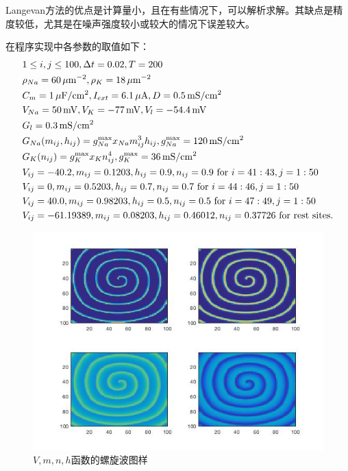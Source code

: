 \documentclass[
bachelor,
nofont, %
pdflinks,
]{xjtuthesis}
\begin{document}
Langevan方法的优点是计算量小，且在有些情况下，可以解析求解。其缺点是精度较低，尤其是在噪声强度较小或较大的情况下误差较大。

\newcommand{\cm}{\mathrm{cm}}
\newcommand{\ms}{\,\mathrm{mS}}
\newcommand{\mv}{\,\mathrm{mV}}
\newcommand{\um}{\,\mathrm{\mu m}}
\newcommand{\uf}{\,\mathrm{\mu F}}
\newcommand{\ua}{\,\mathrm{\mu A}}

在程序实现中各参数的取值如下：
\begin{align*}
& 1 \le i,j \le 100, \Delta t = 0.02, T = 200 \\
& \rho_{Na} = 60 \um^{-2}, \rho_{K} = 18 \um^{-2}\\
& C_m = 1 \uf / \cm ^2, I _{ext} = 6.1 \ua, D = 0.5 \ms / \cm ^2\\
& \vna = 50 \mv, \vk = -77 \mv, \vl = -54.4 \mv\\
& \gl = 0.3 \ms / \cm^2\\
& \gna (m_{ij}, h_{ij}) = g _{Na} ^{\max} x _{Na} m ^3 _{ij} h _{ij}, g ^{\max} _{Na} = 120 \ms / \cm ^2\\
& \gk (n_{ij}) = g_{K} ^{\max} x_{K} n^4 _{ij}, g_{K} ^{\max} = 36 \ms / \cm ^2 \\
& V_{ij}=-40.2, m_{ij}=0.1203, h_{ij}=0.9, n_{ij}=0.9 \text{ for } i=41:43, j = 1 : 50 \\
& V_{ij}=0, m_{ij}=0.5203, h_{ij}=0.7, n_{ij}=0.7 \text{ for } i = 44 : 46, j = 1 : 50\\
& V_{ij}=40.0, m_{ij}=0.98203, h_{ij}=0.5, n_{ij}=0.5 \text{ for } i = 47 : 49, j = 1 : 50\\
& V_{ij}=-61.19389, m_{ij}=0.08203, h _{ij}=0.46012, n_{ij}=0.37726 \text{ for rest sites.}\\
\end{align*}

\clearpage

\begin{figure}[!ht]
\centering
\includegraphics[scale=0.68]{xin_1.jpg}
\caption{$V,m,n,h$函数的螺旋波图样}
\end{figure}
\end{document}
